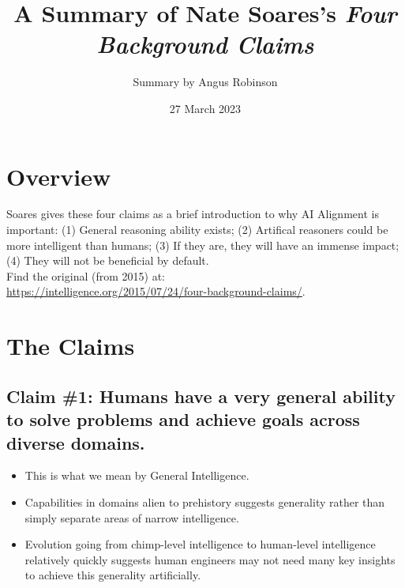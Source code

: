 \documentclass{article}
\title{A Summary of Nate Soares's \textit{Four Background Claims}}
\author{Summary by Angus Robinson}
\date{27 March 2023}
\begin{document}

\maketitle
\begin{multicols}{2}

\section{Overview}

Soares gives these four claims as a brief introduction to why AI Alignment is important: (1) General reasoning ability exists; (2) Artifical reasoners could be more intelligent than humans; (3) If they are, they will have an immense impact; (4) They will not be beneficial by default.
 \\ Find the original (from 2015) at: \\ \href{https://intelligence.org/2015/07/24/four-background-claims/}{https://intelligence.org/2015/07/24/four-background-claims/}.

\section{The Claims}
\subsection{Claim \#1: Humans have a very general ability to solve problems and achieve goals across diverse domains.}
\begin{itemize}
\item This is what we mean by General Intelligence.
\item Capabilities in domains alien to prehistory suggests generality rather than simply separate areas of narrow intelligence.
\item Evolution going from chimp-level intelligence to human-level intelligence relatively quickly suggests human engineers may not need many key insights to achieve this generality artificially.
\end{itemize}


\end{multicols}
\end{document}
